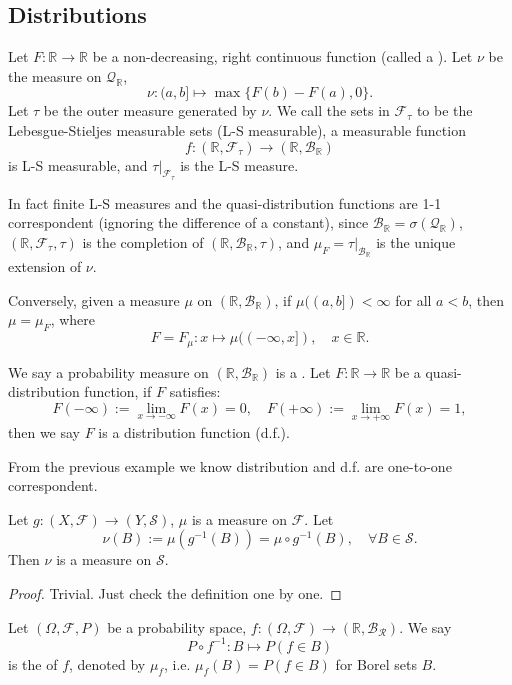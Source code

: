 \subsection{Distributions}
\label{sub:Distributions}

Let $F: \mathbb{R}\to \mathbb{R}$ be a non-decreasing, right continuous
function (called a ).
Let $\nu$ be the measure on $\mathscr{Q}_{\mathbb{R}}$,
\[
	\nu : (a,b] \mapsto \max\{F(b)-F(a), 0\}.
\]
Let $\tau$ be the outer measure generated by $\nu$. 
We call the sets in $\mathscr{F}_\tau$ to be the Lebesgue-Stieljes
measurable sets (L-S measurable), a measurable function
\[
f: (\mathbb{R}, \mathscr{F}_\tau)\to
(\mathbb{R}, \mathscr{B}_{\mathbb{R}})
\]
is L-S measurable, and $\tau\big|_{\mathscr{F}_\tau}$
is the L-S measure.

In fact finite L-S measures and the quasi-distribution functions are 1-1
correspondent (ignoring the difference of a constant),
since $\mathscr{B}_{\mathbb{R}}=\sigma(\mathscr{Q}_{\mathbb{R}})$,
$(\mathbb{R},\mathscr{F}_\tau,\tau)$ is the completion of
$(\mathbb{R}, \mathscr{B}_{\mathbb{R}},\tau)$,
and $\mu_F = \tau\big|_{\mathscr{B}_{\mathbb{R}}}$ is the
unique extension of $\nu$. 

Conversely, given a measure $\mu$ on
$(\mathbb{R}, \mathscr{B}_{\mathbb{R}})$,
if $\mu((a,b])<\infty$ for all $a<b$, then  $\mu=\mu_F$, where
\[
	 F = F_\mu : x \mapsto \mu((-\infty,x]), \quad x\in \mathbb{R}.
\]

We say a probability measure on $(\mathbb{R}, \mathscr{B}_{\mathbb{R}})$ is
a .
Let $F: \mathbb{R}\to \mathbb{R}$ be a quasi-distribution function,
if $F$ satisfies:
 \[
F(-\infty) := \lim_{x\to -\infty}F(x) = 0,\quad
F(+\infty):=\lim_{x\to +\infty}F(x) = 1,
\]
then we say $F$ is a distribution function (d.f.).

From the previous example we know distribution
and d.f. are one-to-one correspondent.

\begin{theorem}
    Let $g: (X,\mathscr{F})\to (Y, \mathscr{S})$, $\mu$ is a measure on $ \mathscr{F}$.
	Let
	\[
	\nu(B):=\mu(g^{-1}(B)) = \mu\circ g^{-1}(B),\quad \forall B\in \mathscr{S}.
	\]
	Then  $\nu$ is a measure on $\mathscr{S}$.
\end{theorem}
\begin{proof}[Proof]
    Trivial. Just check the definition one by one.
\end{proof}

Let $(\Omega, \mathscr{F}, P)$ be a probability space, $f:(\Omega, \mathscr{F})
\to (\mathbb{R}, \mathscr{B}_{\mathscr{R}})$. We say
\[
P\circ f^{-1} : B\mapsto P(f\in B)
\]
is the  of $f$, denoted by $\mu_f$, i.e.
$\mu_f(B) = P(f\in B)$ for Borel sets $B$.

